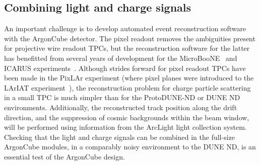 \subsection{Combining light and charge signals}
An important challenge is to develop automated event reconstruction software with the ArgonCube detector. The pixel readout removes the ambiguities present for projective wire readout TPCs, but the reconstruction software for the latter has benefitted from several years of development for the MicroBooNE~\cite{microboone} and ICARUS experiments~\cite{icarus}. Although strides forward for pixel readout TPCs have been made in the PixLAr experiment (where pixel planes were introduced to the LArIAT experiment~\cite{lariat}), the reconstruction problem for charge particle scattering in a small TPC is much simpler than for the ProtoDUNE-ND or DUNE ND environments. Additionally, the reconstructed track position along the drift direction, and the suppression of cosmic backgrounds within the beam window, will be performed using information from the ArcLight light collection system. Checking that the light and charge signals can be combined in the full-size ArgonCube modules, in a comparably noisy environment to the DUNE ND, is an essential test of the ArgonCube design.

